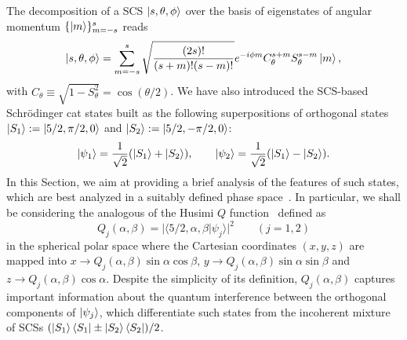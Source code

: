 The decomposition of a \ac{SCS} $\ket{s,\theta,\phi}$ over the basis of eigenstates of angular momentum $\{\ket{m}\}_{m=-s}^s$ reads
\begin{equation}
	\ket{s,\theta,\phi} =
	\sum^s_{m=-s}
		\sqrt{\frac{(2s)!}{(s+m)!(s-m)!}}
		e^{-i\phi m} C^{s+m}_\theta S^{s-m}_\theta \ket{m},
\end{equation}
with $C_\theta\equiv\sqrt{1-S^2_\theta}=\cos(\theta/2)$. We have also introduced the \ac{SCS}-based Schrödinger cat states built as the following superpositions of orthogonal states $\ket{S_1}:=\ket{5/2,\pi/2,0}$ and $\ket{S_2}:=\ket{5/2,-\pi/2,0}$:
\begin{equation}
\ket{\psi_{1}}=\frac{1}{\sqrt 2}(\ket{S_1}+\ket{S_2}),\qquad\ket{\psi_{2}}=\frac{1}{\sqrt 2}(\ket{S_1}-\ket{S_2}).
\end{equation}
In this Section, we aim at providing a brief analysis of the features of such states, which are best analyzed in a suitably defined phase space~\cite{agarwal1997atomic}. In particular, we shall be considering the analogous of the Husimi $Q$ function~\cite{walls2007quantum} defined as
\begin{equation}
\label{deco}
Q_j(\alpha,\beta)=\vert\langle{5/2,\alpha,\beta}\vert\psi_j\rangle\vert^2\qquad(j=1,2)
\end{equation}
in the spherical polar space where the Cartesian coordinates $(x,y,z)$ are mapped into $x\to Q_j(\alpha,\beta)\sin\alpha\cos\beta$, $y\to Q_j(\alpha,\beta)\sin\alpha\sin\beta$ and $z\to Q_j(\alpha,\beta)\cos\alpha$. Despite the simplicity of its definition, $Q_j(\alpha,\beta)$ captures important information about the quantum interference between the orthogonal components of $\ket{\psi_{j}}$, which differentiate such states from the incoherent mixture of \acp{SCS} $(\ket{S_1}\bra{S_1}\pm\ket{S_2}\bra{S_2})/2$. 

